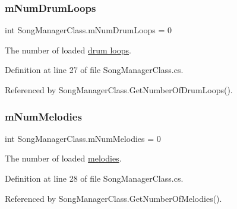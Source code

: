 \subsubsection{\texorpdfstring{m\+Num\+Drum\+Loops}{mNumDrumLoops}}
{\footnotesize\ttfamily int Song\+Manager\+Class.\+m\+Num\+Drum\+Loops = 0\hspace{0.3cm}{\ttfamily [private]}}



The number of loaded \hyperlink{group___song_group_DocSongDrumLoop}{drum loops}. 



Definition at line 27 of file Song\+Manager\+Class.\+cs.



Referenced by Song\+Manager\+Class.\+Get\+Number\+Of\+Drum\+Loops().

\mbox{\label{group___s_m_priv_var_ga58ea3b4f794b9e444eece384ae6e8197}} 
\subsubsection{\texorpdfstring{m\+Num\+Melodies}{mNumMelodies}}
{\footnotesize\ttfamily int Song\+Manager\+Class.\+m\+Num\+Melodies = 0\hspace{0.3cm}{\ttfamily [private]}}



The number of loaded \hyperlink{group___song_group_DocSongMelody}{melodies}. 



Definition at line 28 of file Song\+Manager\+Class.\+cs.



Referenced by Song\+Manager\+Class.\+Get\+Number\+Of\+Melodies().


